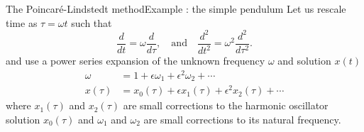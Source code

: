 \documentclass[usenames,dvipsnames,svgnames,10pt,aspectratio=169]{beamer}
\begin{document}
\begin{frame}[t, c]{The Poincaré-Lindstedt method}{Example : the simple pendulum}
  Let us rescale time as $\tau = \omega t$ such that
  \[
  \dfrac{d}{dt} = \omega \dfrac{d}{d\tau}, \quad \text{and} \quad \dfrac{d^2}{dt^2} = \omega^2 \dfrac{d^2}{d\tau^2}.
  \]
  and use a power series expansion of the unknown frequency $\omega$ and solution $x(t)$
  \[
  \begin{aligned}
    \omega & = 1 + \epsilon \omega_1 + \epsilon^2 \omega_2 + \cdots \\
    x(\tau) & = x_0(\tau) + \epsilon x_1(\tau) + \epsilon^2 x_2(\tau) + \cdots
  \end{aligned}
  \]
  where $x_1(\tau)$ and $x_2(\tau)$ are small corrections to the harmonic oscillator solution $x_0(\tau)$ and $\omega_1$ and $\omega_2$ are small corrections to its natural frequency.

  \vspace{1cm}
\end{frame}
\end{document}
